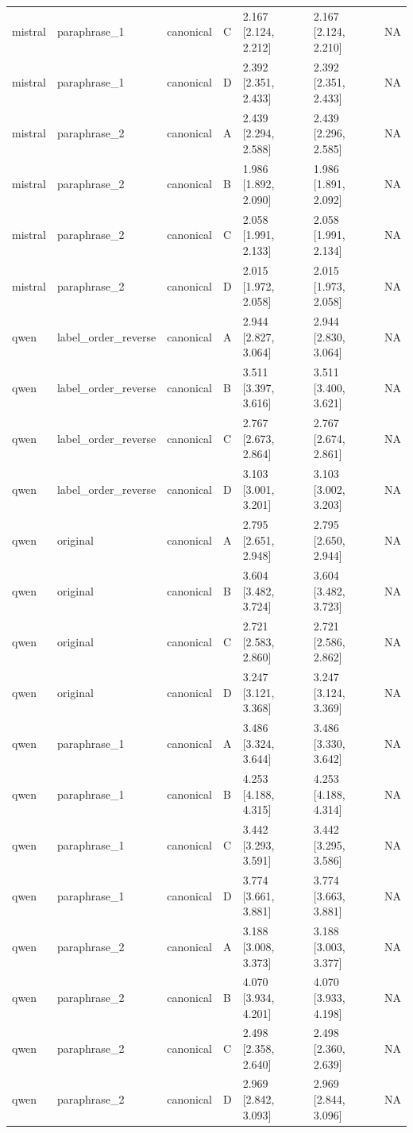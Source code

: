 \begin{tabular}{lllllll}
mistral & paraphrase\_1 & canonical & C & 2.167 [2.124, 2.212] & 2.167 [2.124, 2.210] & NA \\
mistral & paraphrase\_1 & canonical & D & 2.392 [2.351, 2.433] & 2.392 [2.351, 2.433] & NA \\
mistral & paraphrase\_2 & canonical & A & 2.439 [2.294, 2.588] & 2.439 [2.296, 2.585] & NA \\
mistral & paraphrase\_2 & canonical & B & 1.986 [1.892, 2.090] & 1.986 [1.891, 2.092] & NA \\
mistral & paraphrase\_2 & canonical & C & 2.058 [1.991, 2.133] & 2.058 [1.991, 2.134] & NA \\
mistral & paraphrase\_2 & canonical & D & 2.015 [1.972, 2.058] & 2.015 [1.973, 2.058] & NA \\
qwen & label\_order\_reverse & canonical & A & 2.944 [2.827, 3.064] & 2.944 [2.830, 3.064] & NA \\
qwen & label\_order\_reverse & canonical & B & 3.511 [3.397, 3.616] & 3.511 [3.400, 3.621] & NA \\
qwen & label\_order\_reverse & canonical & C & 2.767 [2.673, 2.864] & 2.767 [2.674, 2.861] & NA \\
qwen & label\_order\_reverse & canonical & D & 3.103 [3.001, 3.201] & 3.103 [3.002, 3.203] & NA \\
qwen & original & canonical & A & 2.795 [2.651, 2.948] & 2.795 [2.650, 2.944] & NA \\
qwen & original & canonical & B & 3.604 [3.482, 3.724] & 3.604 [3.482, 3.723] & NA \\
qwen & original & canonical & C & 2.721 [2.583, 2.860] & 2.721 [2.586, 2.862] & NA \\
qwen & original & canonical & D & 3.247 [3.121, 3.368] & 3.247 [3.124, 3.369] & NA \\
qwen & paraphrase\_1 & canonical & A & 3.486 [3.324, 3.644] & 3.486 [3.330, 3.642] & NA \\
qwen & paraphrase\_1 & canonical & B & 4.253 [4.188, 4.315] & 4.253 [4.188, 4.314] & NA \\
qwen & paraphrase\_1 & canonical & C & 3.442 [3.293, 3.591] & 3.442 [3.295, 3.586] & NA \\
qwen & paraphrase\_1 & canonical & D & 3.774 [3.661, 3.881] & 3.774 [3.663, 3.881] & NA \\
qwen & paraphrase\_2 & canonical & A & 3.188 [3.008, 3.373] & 3.188 [3.003, 3.377] & NA \\
qwen & paraphrase\_2 & canonical & B & 4.070 [3.934, 4.201] & 4.070 [3.933, 4.198] & NA \\
qwen & paraphrase\_2 & canonical & C & 2.498 [2.358, 2.640] & 2.498 [2.360, 2.639] & NA \\
qwen & paraphrase\_2 & canonical & D & 2.969 [2.842, 3.093] & 2.969 [2.844, 3.096] & NA \\
\bottomrule
\end{tabular}
